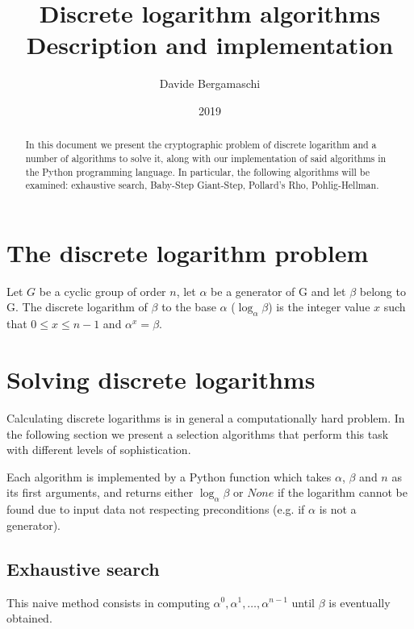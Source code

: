 \documentclass[UTF8]{article}
\begin{document}
\title{
    Discrete logarithm algorithms \\
    \large Description and implementation
}
\author{Davide Bergamaschi}
\date{2019}
\maketitle

\begin{abstract}
\noindent In this document we present the cryptographic problem of discrete logarithm and a number of algorithms to solve it, along with our implementation of said algorithms in the Python programming language. In particular, the following algorithms will be examined: exhaustive search, Baby-Step Giant-Step, Pollard's Rho, Pohlig-Hellman.
\end{abstract}

\section{The discrete logarithm problem}

Let $G$ be a cyclic group of order $n$, let $\alpha$ be a generator of G and let $\beta$ belong to G. The discrete logarithm of $\beta$ to the base $\alpha$ ($\log_{\alpha}\beta$) is the integer value $x$ such that $0 \leq x \leq n - 1$ and $\alpha^x=\beta$.

\section{Solving discrete logarithms}

Calculating discrete logarithms is in general a computationally hard problem. In the following section we present a selection algorithms that perform this task with different levels of sophistication.

Each algorithm is implemented by a Python function which takes $\alpha$, $\beta$ and $n$ as its first arguments, and returns either $\log_{\alpha}\beta$ or $None$ if the logarithm cannot be found due to input data not respecting preconditions (e.g. if $\alpha$ is not a generator).

\newpage

\subsection{Exhaustive search}

This naive method consists in computing $\alpha^0, \alpha^1, \ldots, \alpha^{n - 1}$ until $\beta$ is eventually obtained.
\end{document}
